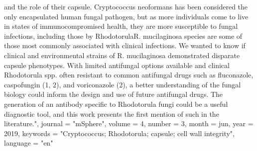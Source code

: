 {              and the role of their capsule. Cryptococcus neoformans has been
              considered the only encapsulated human fungal pathogen, but as
              more individuals come to live in states of immunocompromised
              health, they are more susceptible to fungal infections, including
              those by RhodotorulaR. mucilaginosa species are some of those
              most commonly associated with clinical infections. We wanted to
              know if clinical and environmental strains of R. mucilaginosa
              demonstrated disparate capsule phenotypes. With limited
              antifungal options available and clinical Rhodotorula spp. often
              resistant to common antifungal drugs such as fluconazole,
              caspofungin (1, 2), and voriconazole (2), a better understanding
              of the fungal biology could inform the design and use of future
              antifungal drugs. The generation of an antibody specific to
              Rhodotorula fungi could be a useful diagnostic tool, and this
              work presents the first mention of such in the literature.",
  journal  = "mSphere",
  volume   =  4,
  number   =  3,
  month    =  jun,
  year     =  2019,
  keywords = "Cryptococcus; Rhodotorula; capsule; cell wall integrity",
  language = "en"
}

